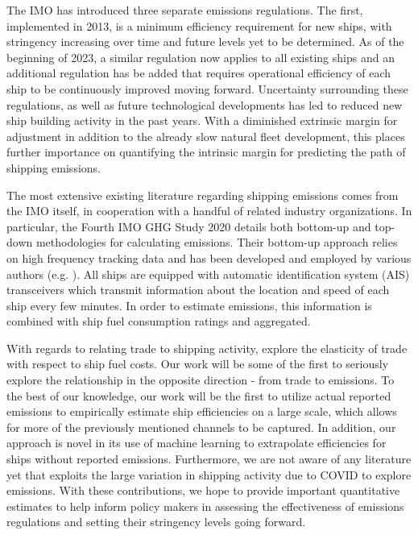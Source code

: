 \documentclass[hidelinks, 12pt,letterpaper]{article}
\begin{document}
The IMO has introduced three separate emissions regulations. The first, implemented in 2013, is a minimum efficiency requirement for new ships, with stringency increasing over time and future levels yet to be determined. As of the beginning of 2023, a similar regulation now applies to all existing ships and an additional regulation has be added that requires operational efficiency of each ship to be continuously improved moving forward. Uncertainty surrounding these regulations, as well as future technological developments has led to reduced new ship building activity in the past years. With a diminished extrinsic margin for adjustment in addition to the already slow natural fleet development, this places further importance on quantifying the intrinsic margin for predicting the path of shipping emissions. 

The most extensive existing literature regarding shipping emissions comes from the IMO itself, in cooperation with a handful of related industry organizations. In particular, the Fourth IMO GHG Study 2020 \citep{faber2020fourth} details both bottom-up and top-down methodologies for calculating emissions. Their bottom-up approach relies on high frequency tracking data and has been developed and employed by various authors (e.g. \citet{olmer2017greenhouse, johansson2017global, jalkanen2009modelling, van2018spatially}). All ships are equipped with automatic identification system (AIS) transceivers which transmit information about the location and speed of each ship every few minutes. In order to estimate emissions, this information is combined with ship fuel consumption ratings and aggregated.

With regards to relating trade to shipping activity, \citet{brancaccio2018impact} explore the elasticity of trade with respect to ship fuel costs. Our work will be some of the first to seriously explore the relationship in the opposite direction - from trade to emissions. To the best of our knowledge, our work will be the first to utilize actual reported emissions to empirically estimate ship efficiencies on a large scale, which allows for more of the previously mentioned channels to be captured. In addition, our approach is novel in its use of machine learning to extrapolate efficiencies for ships without reported emissions. Furthermore, we are not aware of any literature yet that exploits the large variation in shipping activity due to COVID to explore emissions. With these contributions, we hope to provide important quantitative estimates to help inform policy makers in assessing the effectiveness of emissions regulations and setting their stringency levels going forward.
\end{document}
